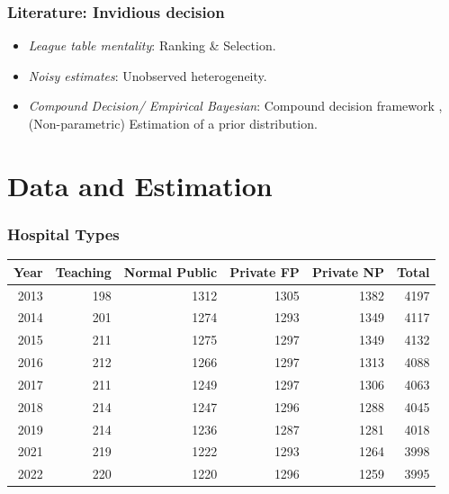 \documentclass[10pt,mathserif,aspectratio=169]{beamer}
\begin{document}
\begin{frame}
  \frametitle{Literature: Invidious decision}
  \begin{itemize}\itemsep=12pt
    \item \textit{League table mentality}: Ranking \& Selection.\citep{gu2023invidious}
    \item \textit{Noisy estimates}: Unobserved heterogeneity. \citep{chetty2014measuring,kline2022systemic}
    \item \textit{Compound Decision/ Empirical Bayesian}: Compound decision framework \citep{robbins1956empirical}, (Non-parametric) Estimation of a prior distribution. \citep{koenker2014convex, gu2017empirical}
  \end{itemize}
\end{frame}

\section{Data and Estimation}

\begin{frame}
  \frametitle{Hospital Types}
  \begin{table}
    \fontsize{10pt}{10pt}\selectfont
    \begin{tabular}{rrrrrr}
      \toprule
      Year & Teaching & Normal Public & Private FP & Private NP & Total \\
      \midrule
      2013 & 198      & 1312          & 1305       & 1382       & 4197  \\
      2014 & 201      & 1274          & 1293       & 1349       & 4117  \\
      2015 & 211      & 1275          & 1297       & 1349       & 4132  \\
      2016 & 212      & 1266          & 1297       & 1313       & 4088  \\
      2017 & 211      & 1249          & 1297       & 1306       & 4063  \\
      2018 & 214      & 1247          & 1296       & 1288       & 4045  \\
      2019 & 214      & 1236          & 1287       & 1281       & 4018  \\
      2021 & 219      & 1222          & 1293       & 1264       & 3998  \\
      2022 & 220      & 1220          & 1296       & 1259       & 3995  \\
      \bottomrule
    \end{tabular}
  \end{table}
\end{frame}
\end{document}
